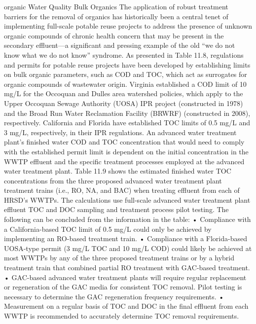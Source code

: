\documentclass{article}
\begin{document}
organic Water Quality Bulk Organics The application of robust treatment
barriers for the removal of organics has historically been a central
tenet of implementing full-scale potable reuse projects to address the
presence of unknown organic compounds of chronic health concern that may
be present in the secondary effluent---a significant and pressing
example of the old ``we do not know what we do not know'' syndrome. As
presented in Table 11.8, regulations and permits for potable reuse
projects have been developed by establishing limits on bulk organic
parameters, such as COD and TOC, which act as surrogates for organic
compounds of wastewater origin. Virginia established a COD limit of 10
mg/L for the Occoquan and Dulles area watershed policies, which apply to
the Upper Occoquan Sewage Authority (UOSA) IPR project (constructed in
1978) and the Broad Run Water Reclamation Facility (BRWRF) (constructed
in 2008), respectively. California and Florida have established TOC
limits of 0.5 mg/L and 3 mg/L, respectively, in their IPR regulations.
An advanced water treatment plant's finished water COD and TOC
concentration that would need to comply with the established permit
limit is dependent on the initial concentration in the WWTP effluent and
the specific treatment processes employed at the advanced water
treatment plant. Table 11.9 shows the estimated finished water TOC
concentrations from the three proposed advanced water treatment plant
treatment trains (i.e., RO, NA, and BAC) when treating effluent from
each of HRSD's WWTPs. The calculations use full-scale advanced water
treatment plant effluent TOC and DOC sampling and treatment process
pilot testing. The following can be concluded from the information in
the table: • Compliance with a California-based TOC limit of 0.5 mg/L
could only be achieved by implementing an RO-based treatment train. •
Compliance with a Florida-based UOSA-type permit (3 mg/L TOC and 10 mg/L
COD) could likely be achieved at most WWTPs by any of the three proposed
treatment trains or by a hybrid treatment train that combined partial RO
treatment with GAC-based treatment. • GAC-based advanced water treatment
plants will require regular replacement or regeneration of the GAC media
for consistent TOC removal. Pilot testing is necessary to determine the
GAC regeneration frequency requirements. • Measurement on a regular
basis of TOC and DOC in the final effluent from each WWTP is recommended
to accurately determine TOC removal requirements.
\end{document}
